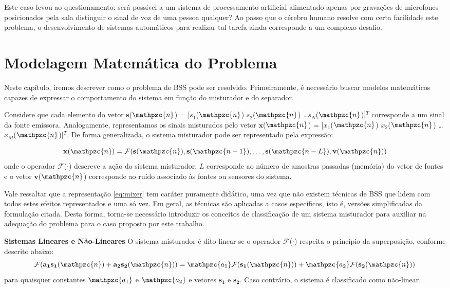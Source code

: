     Este caso levou ao questionamento: será possível a um sistema de processamento artificial alimentado apenas por gravações de microfones posicionados pela sala distinguir o sinal de voz de uma pessoa qualquer? Ao passo que o cérebro humano resolve com certa facilidade este problema, o desenvolvimento de sistemas automáticos para realizar tal tarefa ainda corresponde a um complexo desafio.

\section{Modelagem Matemática do Problema}\label{sec:model}
    Neste capítulo, iremos descrever como o problema de BSS pode ser resolvido. Primeiramente, é necessário buscar modelos matemáticos capazes de expressar o comportamento do sistema em função do misturador e do separador.
    
    Considere que cada elemento do vetor $\mathbf{s}$($\mathpzc{n}$) = [${s_1}$($\mathpzc{n}$) ${s_2}$($\mathpzc{n}$) \dots  $s_N$($\mathpzc{n}$)]$^T$ corresponde a um sinal da fonte emissora. Analogamente, representamos os sinais misturados pelo vetor  $\mathbf{x}$($\mathpzc{n}$) = [${x_1}$($\mathpzc{n}$) ${x_2}$($\mathpzc{n}$) \dots  ${x_M}$($\mathpzc{n}$)]$^T$. De forma generalizada, o sistema misturador pode ser representado pela expressão:

    \begin{equation}\label{eq:mixer}
        \mathbf{x}(\mathpzc{n}) = \mathcal{F}(\mathbf{s}(\mathpzc{n}), \mathbf{s}(\mathpzc{n-1}), \dots, \mathbf{s}(\mathpzc{n - L}), \mathbf{v}(\mathpzc{n}))
    \end{equation}
    onde o operador $\mathcal{F}$($\cdot$) descreve a ação do sistema misturador, $L$ corresponde ao número de amostras passadas (memória) do vetor de fontes e o vetor $\mathbf{v}$($\mathpzc{n}$) corresponde ao ruído associado às fontes ou sensores do sistema.
    
    Vale ressaltar que a representação \ref{eq:mixer} tem caráter puramente didático, uma vez que não existem técnicas de BSS que lidem com todos estes efeitos representados e uma só vez. Em geral, as técnicas são aplicadas a casos específicos, isto é, versões simplificadas da formulação citada. Desta forma, torna-se necessário introduzir os conceitos de classificação de um sistema misturador para auxiliar na adequação do problema para o caso proposto por este trabalho.
    
    \textbf{Sistemas Lineares e Não-Lineares} O sistema misturador é dito linear se o operador  $\mathcal{F}$($\cdot$) respeita o princípio da superposição, conforme descrito abaixo:
        \begin{equation}\label{eq:linearity}
            \mathcal{F}(\mathbf{a_1}\mathbf{s_1}(\mathpzc{n}) + \mathbf{a_2}\mathbf{s_2}(\mathpzc{n})) = \mathpzc{a_1}\mathcal{F}(\mathbf{s_1}(\mathpzc{n})) + \mathpzc{a_2}\mathcal{F}(\mathbf{s_2}(\mathpzc{n}))
        \end{equation}
    para quaisquer constantes $\mathpzc{a_1}$ e $\mathpzc{a_2}$ e vetores $\mathbf{s_1}$ e $\mathbf{s_2}$. Caso contrário, o sistema é classificado como não-linear. 
    
